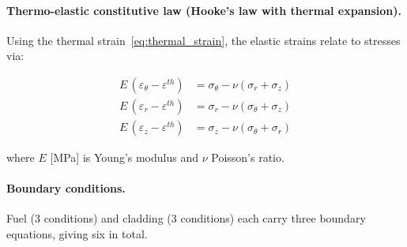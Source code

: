 \begin{refsection}


\paragraph{Thermo-elastic constitutive law (Hooke's law with thermal expansion).} Using the thermal strain~\eqref{eq:thermal_strain}, the elastic strains relate to stresses via:

\begin{align}
  E\,(\varepsilon_\theta - \varepsilon^{th}) &= \sigma_\theta - \nu(\sigma_r + \sigma_z)
  \label{eq:hooke_h}\\
  E\,(\varepsilon_r     - \varepsilon^{th}) &= \sigma_r     - \nu(\sigma_\theta + \sigma_z)
  \label{eq:hooke_r}\\
  E\,(\varepsilon_z     - \varepsilon^{th}) &= \sigma_z     - \nu(\sigma_\theta + \sigma_r)
  \label{eq:hooke_z}
\end{align}

where $E$ [MPa] is Young's modulus and $\nu$ Poisson's ratio.


\paragraph{Boundary conditions.}

Fuel (3 conditions) and cladding (3 conditions) each carry three boundary equations, giving six in total.


\end{refsection}
